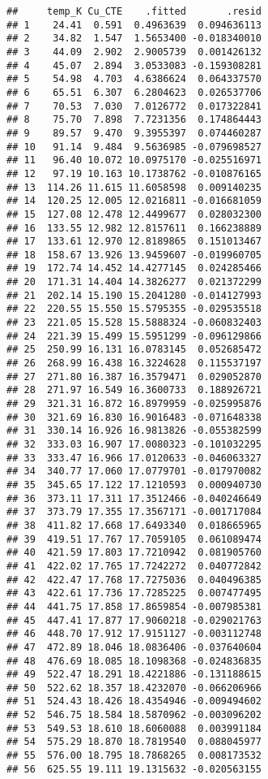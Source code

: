 \documentclass[]{book}
\theoremstyle{definition}
\theoremstyle{definition}
\theoremstyle{definition}
\theoremstyle{remark}
\begin{document}
\begin{verbatim}
##     temp_K Cu_CTE    .fitted       .resid
## 1    24.41  0.591  0.4963639  0.094636113
## 2    34.82  1.547  1.5653400 -0.018340010
## 3    44.09  2.902  2.9005739  0.001426132
## 4    45.07  2.894  3.0533083 -0.159308281
## 5    54.98  4.703  4.6386624  0.064337570
## 6    65.51  6.307  6.2804623  0.026537706
## 7    70.53  7.030  7.0126772  0.017322841
## 8    75.70  7.898  7.7231356  0.174864443
## 9    89.57  9.470  9.3955397  0.074460287
## 10   91.14  9.484  9.5636985 -0.079698527
## 11   96.40 10.072 10.0975170 -0.025516971
## 12   97.19 10.163 10.1738762 -0.010876165
## 13  114.26 11.615 11.6058598  0.009140235
## 14  120.25 12.005 12.0216811 -0.016681059
## 15  127.08 12.478 12.4499677  0.028032300
## 16  133.55 12.982 12.8157611  0.166238889
## 17  133.61 12.970 12.8189865  0.151013467
## 18  158.67 13.926 13.9459607 -0.019960705
## 19  172.74 14.452 14.4277145  0.024285466
## 20  171.31 14.404 14.3826277  0.021372299
## 21  202.14 15.190 15.2041280 -0.014127993
## 22  220.55 15.550 15.5795355 -0.029535518
## 23  221.05 15.528 15.5888324 -0.060832403
## 24  221.39 15.499 15.5951299 -0.096129866
## 25  250.99 16.131 16.0783145  0.052685472
## 26  268.99 16.438 16.3224628  0.115537197
## 27  271.80 16.387 16.3579471  0.029052870
## 28  271.97 16.549 16.3600733  0.188926721
## 29  321.31 16.872 16.8979959 -0.025995876
## 30  321.69 16.830 16.9016483 -0.071648338
## 31  330.14 16.926 16.9813826 -0.055382599
## 32  333.03 16.907 17.0080323 -0.101032295
## 33  333.47 16.966 17.0120633 -0.046063327
## 34  340.77 17.060 17.0779701 -0.017970082
## 35  345.65 17.122 17.1210593  0.000940730
## 36  373.11 17.311 17.3512466 -0.040246649
## 37  373.79 17.355 17.3567171 -0.001717084
## 38  411.82 17.668 17.6493340  0.018665965
## 39  419.51 17.767 17.7059105  0.061089474
## 40  421.59 17.803 17.7210942  0.081905760
## 41  422.02 17.765 17.7242272  0.040772842
## 42  422.47 17.768 17.7275036  0.040496385
## 43  422.61 17.736 17.7285225  0.007477495
## 44  441.75 17.858 17.8659854 -0.007985381
## 45  447.41 17.877 17.9060218 -0.029021763
## 46  448.70 17.912 17.9151127 -0.003112748
## 47  472.89 18.046 18.0836406 -0.037640604
## 48  476.69 18.085 18.1098368 -0.024836835
## 49  522.47 18.291 18.4221886 -0.131188615
## 50  522.62 18.357 18.4232070 -0.066206966
## 51  524.43 18.426 18.4354946 -0.009494602
## 52  546.75 18.584 18.5870962 -0.003096202
## 53  549.53 18.610 18.6060088  0.003991184
## 54  575.29 18.870 18.7819540  0.088045977
## 55  576.00 18.795 18.7868265  0.008173532
## 56  625.55 19.111 19.1315632 -0.020563155

\end{verbatim}
\end{document}
